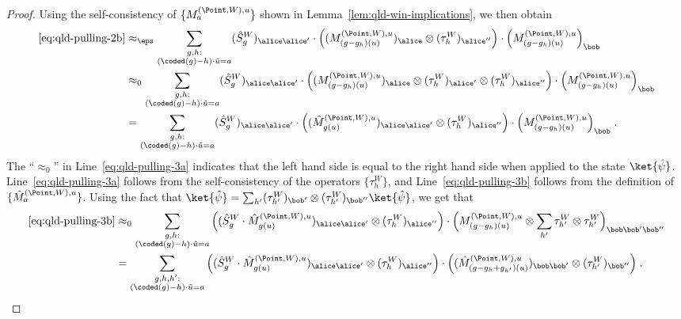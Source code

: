 \begin{proof}
	Using the self-consistency of $\{M^{(\Point,W),u}_a\}$ shown in Lemma~\ref{lem:qld-win-implications}, we then obtain
	\begin{align}
		\text{\eqref{eq:qld-pulling-2b}} &\approx_{\eps} \sum_{\substack{g,h: \\ (\coded(g)-h)\cdot \tilde{u} = a}} (\hat{S}^W_g)_{\alice \alice'} \cdot \Big((M^{(\Point,W),u}_{(g-g_h)(u)})_{\alice} \otimes (\tau_h^W)_{\alice''} \Big) \cdot \Big ( M^{(\Point,W),u}_{(g-g_h)(u)} \Big)_{\bob} \label{eq:qld-pulling-3} \\
		&\approx_{0}\sum_{\substack{g,h: \\ (\coded(g)-h)\cdot \tilde{u} = a}} (\hat{S}^W_g)_{\alice \alice'} \cdot \Big((M^{(\Point,W),u}_{(g-g_h)(u)})_{\alice} \otimes (\tau_h^W)_{\alice'} \otimes (\tau_h^W)_{\alice''} \Big) \cdot \Big ( M^{(\Point,W),u}_{(g-g_h)(u)} \Big)_{\bob} \label{eq:qld-pulling-3a} \\
		&= \sum_{\substack{g,h: \\ (\coded(g)-h)\cdot \tilde{u} = a}} (\hat{S}^W_g)_{\alice \alice'} \cdot \Big((\hat{M}^{(\Point,W),u}_{g(u)})_{\alice \alice'} \otimes (\tau_h^W)_{\alice''} \Big) \cdot \Big ( M^{(\Point,W),u}_{(g-g_h)(u)} \Big)_{\bob} \;. \label{eq:qld-pulling-3b}
	\end{align}
	The ``$\approx_0$'' in Line~\eqref{eq:qld-pulling-3a} indicates that the left hand side is equal to the right hand side when applied to the state $\ket{\hat{\psi}}$. Line~\eqref{eq:qld-pulling-3a} follows from the self-consistency of the operators $\{\tau^W_h\}$, and Line~\eqref{eq:qld-pulling-3b} follows from the definition of $\{ \hat{M}^{(\Point,W),u}_a\}$. Using the fact that $\ket{\hat{\psi}} = \sum_{h'} (\tau^W_{h'})_{\bob'} \otimes (\tau^W_{h'})_{\bob''} \ket{\hat{\psi}}$, we get that 
	\begin{align}
	\text{\eqref{eq:qld-pulling-3b}} & \approx_0 \sum_{\substack{g,h: \\ (\coded(g)-h)\cdot \tilde{u} = a}} \Big((\hat{S}^W_g \cdot \hat{M}^{(\Point,W),u}_{g(u)})_{\alice \alice'} \otimes (\tau_h^W)_{\alice''} \Big) \cdot \Big( M^{(\Point,W),u}_{(g-g_h)(u)} \otimes \sum_{h'} \tau_{h'}^W \otimes \tau_{h'}^W\Big)_{\bob \bob' \bob''} \label{eq:qld-pulling-4} \\
		&= \sum_{\substack{g,h,h': \\ (\coded(g)-h)\cdot \tilde{u} = a}} \Big((\hat{S}^W_g \cdot \hat{M}^{(\Point,W),u}_{g(u)})_{\alice \alice'} \otimes (\tau_h^W)_{\alice''} \Big) \cdot \Big( (\hat{M}^{(\Point,W),u}_{(g-g_h+g_{h'})(u)})_{\bob \bob'} \otimes (\tau_{h'}^W)_{\bob''} \Big) \;. \label{eq:qld-pulling-5}

\end{align}
\end{proof}
